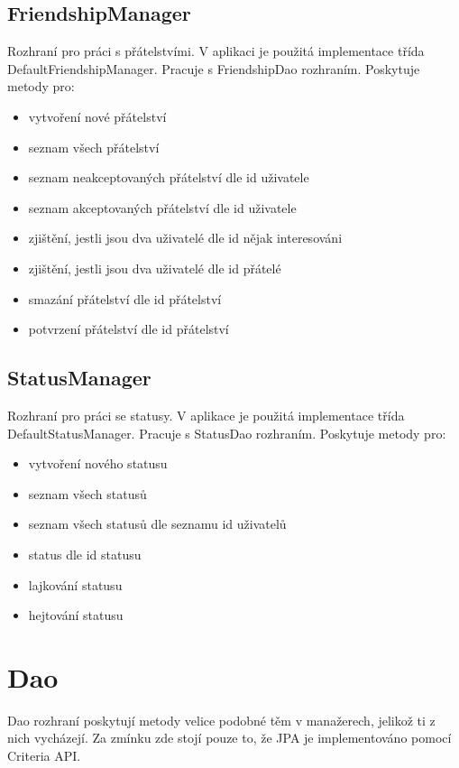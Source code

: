 \documentclass[
12pt,
a4paper,
pdftex,
czech,
titlepage
]{report}
\begin{document}
\subsection{FriendshipManager}

Rozhraní pro práci s přátelstvími. V aplikaci je použitá implementace třída DefaultFriendshipManager. Pracuje s FriendshipDao rozhraním. Poskytuje metody pro:

\begin{itemize}
\item vytvoření nové přátelství
\item seznam všech přátelství
\item seznam neakceptovaných přátelství dle id uživatele
\item seznam akceptovaných přátelství dle id uživatele
\item zjištění, jestli jsou dva uživatelé dle id nějak interesováni
\item zjištění, jestli jsou dva uživatelé dle id přátelé
\item smazání přátelství dle id přátelství
\item potvrzení přátelství dle id přátelství
\end{itemize}

\subsection{StatusManager}

Rozhraní pro práci se statusy. V aplikace je použitá implementace třída DefaultStatusManager. Pracuje s StatusDao rozhraním. Poskytuje metody pro:

\begin{itemize}
\item vytvoření nového statusu
\item seznam všech statusů
\item seznam všech statusů dle seznamu id uživatelů
\item status dle id statusu
\item lajkování statusu
\item hejtování statusu
\end{itemize}

\section{Dao}

Dao rozhraní poskytují metody velice podobné těm v manažerech, jelikož ti z nich vycházejí. Za zmínku zde stojí pouze to, že JPA je implementováno pomocí Criteria API. 
\end{document}
